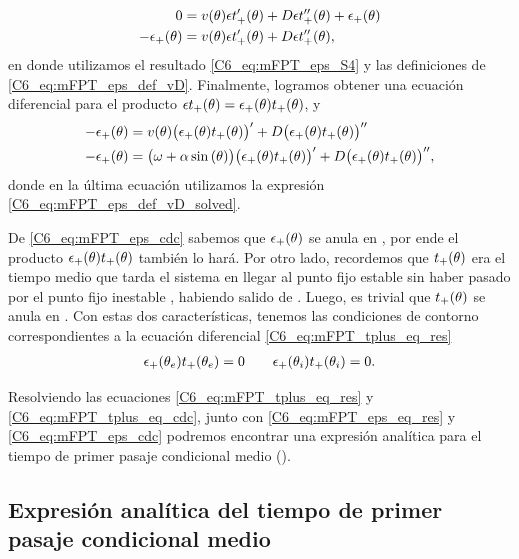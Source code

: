 \documentclass[./main.tex]{subfiles}
\begin{document}
\begin{align}
       0 &= v(\theta) \epsilon t_+'(\theta)  + D \epsilon t_+''(\theta) + \epsilon_{+}(\theta) \nonumber\\
       -\epsilon_{+}(\theta) &= v(\theta) \epsilon t_+'(\theta)  + D \epsilon t_+''(\theta),
\end{align}
en donde utilizamos el resultado \ref{C6_eq:mFPT_eps_S4} y las definiciones de \ref{C6_eq:mFPT_eps_def_vD}.
Finalmente, logramos obtener una ecuación diferencial para el producto $\epsilon t_+(\theta) = \epsilon_{+}(\theta) t_{+}(\theta)$, y
\begin{align}
       - \epsilon_{+}(\theta) &= v(\theta) \big(\epsilon_{+}(\theta) t_{+}(\theta)\big)'  + D  \big(\epsilon_{+}(\theta) t_{+}(\theta)\big)''  \nonumber \\
     - \epsilon_{+}(\theta) &= \big(\omega + \alpha \sin{(\ensuremath{\theta})}\big) \big(\epsilon_{+}(\theta) t_{+}(\theta)\big)'  + D \big(\epsilon_{+}(\theta) t_{+}(\theta)\big)'' ,
       \label{C6_eq:mFPT_tplus_eq_res}
\end{align}
donde en la última ecuación utilizamos la expresión  \ref{C6_eq:mFPT_eps_def_vD_solved}.

De \ref{C6_eq:mFPT_eps_cdc} sabemos que $\epsilon_{+}(\theta)$ se anula en \xxi, por ende el producto $\epsilon_{+}(\theta) t_{+}(\theta)$ también lo hará. Por otro lado, recordemos que $t_{+}(\theta)$ era el tiempo medio que tarda el sistema en llegar al punto fijo estable \xxe sin haber pasado por el punto fijo inestable \xxi, habiendo salido de \xx. Luego, es trivial que $t_{+}(\theta)$ se anula en \xxe. Con estas dos características, tenemos las condiciones de contorno correspondientes a la ecuación diferencial \ref{C6_eq:mFPT_tplus_eq_res}
\begin{align}
    \epsilon_{+}(\theta_e) t_{+}(\theta_e) = 0 \qquad \epsilon_{+}(\theta_i) t_{+}(\theta_i) = 0 .
    \label{C6_eq:mFPT_tplus_eq_cdc}
\end{align}

Resolviendo las ecuaciones \ref{C6_eq:mFPT_tplus_eq_res} y \ref{C6_eq:mFPT_tplus_eq_cdc}, junto con \ref{C6_eq:mFPT_eps_eq_res} y \ref{C6_eq:mFPT_eps_cdc} podremos encontrar una expresión analítica para el tiempo de primer pasaje condicional medio \tplus(\xx). 


\subsection{Expresión analítica del tiempo de primer pasaje condicional medio}
\end{document}
